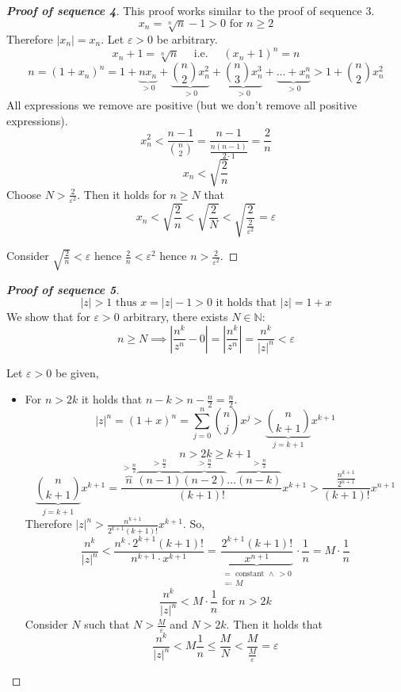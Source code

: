 \documentclass[a4paper,landscape,twocolumn]{article}
\newcommand\abs[1]{\left|#1\right|}
\begin{document}
\begin{proof}[\textbf{Proof of sequence 4}]
  This proof works similar to the proof of sequence 3.
  \[ x_n = \sqrt[n]{n} - 1 > 0 \text{ for } n \geq 2 \]
  Therefore $\abs{x_n} = x_n$. Let $\varepsilon > 0$ be arbitrary.
  \[ x_n + 1 = \sqrt[n]{n} \quad\text{ i.e. }\quad (x_n + 1)^n = n \]
  \[
      n = (1 + x_n)^n
      = 1 + \underbrace{nx_n}_{> 0} + \underbrace{\binom n2 x_n^2}_{> 0} + \underbrace{\binom n3 x_n^3}_{>0} + \underbrace{\dots + x_n^n}_{> 0}
      > 1 + \binom n2 x_n^2
  \]
  All expressions we remove are positive (but we don't remove all positive expressions).
  \[ x_n^2 < \frac{n-1}{\binom n2} = \frac{n-1}{\frac{n(n-1)}{2 \cdot 1}} = \frac2n \]
  \[ x_n < \sqrt{\frac2n} \]
  Choose $N > \frac2{\varepsilon^2}$. Then it holds for $n \geq N$ that
  \[ x_n < \sqrt{\frac2n} < \sqrt{\frac2N} < \sqrt{\frac2{\frac2{\varepsilon^2}}} = \varepsilon \]

  Consider $\sqrt{\frac2n} < \varepsilon$ hence $\frac2n < \varepsilon^2$ hence $n > \frac2{\varepsilon^2}$.
\end{proof}

\begin{proof}[\textbf{Proof of sequence 5}]
  \[ \abs{z} > 1 \text{ thus } x = \abs{z} - 1 > 0 \text{ it holds that } \abs{z} = 1 + x \]
  We show that for $\varepsilon > 0$ arbitrary, there exists $N \in \mathbb N$:
  \[ n \geq N \implies \abs{\frac{n^k}{z^n} - 0} = \abs{\frac{n^k}{z^n}} = \frac{n^k}{\abs{z}^n} < \varepsilon \]

  Let $\varepsilon > 0$ be given,
  \begin{itemize}
    \item
      For $n > 2k$ it holds that $n - k > n - \frac{n}2 = \frac{n}2$.
      \[ \abs{z}^n = (1 + x)^n = \sum_{j=0}^n \binom{n}{j} x^j > \underbrace{\binom{n}{k + 1}}_{j=k+1} x^{k+1} \]
      \[ n > 2k \geq k + 1 \]
      \[
          \underbrace{\binom{n}{k + 1}}_{j=k+1} x^{k+1}
          = \frac{\overbrace{n}^{>\frac{n}2} \overbrace{(n-1)}^{>\frac{n}2} \overbrace{(n-2)}^{>\frac{n}2} \dots \overbrace{(n-k)}^{>\frac{n}2}}{(k+1)!} x^{k+1}
          > \frac{\frac{n^{k+1}}{2^{n+1}}}{(k+1)!} x^{n+1}
      \]
      Therefore $\abs{z}^n > \frac{n^{k+1}}{2^{k+1} (k+1)!} x^{k+1}$.
      So,
      \[
          \frac{n^k}{\abs{z}^n} <
          \frac{n^k \cdot 2^{k+1} (k+1)!}{n^{k+1} \cdot x^{k+1}} =
          \underbrace{\frac{2^{k+1} (k+1)!}{x^{n+1}}}_{\substack{= \text{ constant } \land\ >0 \\ \eqqcolon\ M}} \cdot \frac1n
          = M \cdot \frac1n
      \] \[
          \frac{n^k}{\abs{z}^n} < M \cdot \frac1n \text{ for } n > 2k
      \]
      Consider $N$ such that $N > \frac{M}{\varepsilon}$ and $N > 2k$.
      Then it holds that
      \[ \frac{n^k}{\abs{z}^n} < M \frac1n \leq \frac{M}{N} < \frac{M}{\frac{M}{\varepsilon}} = \varepsilon \]
  \end{itemize}
\end{proof}
\end{document}
